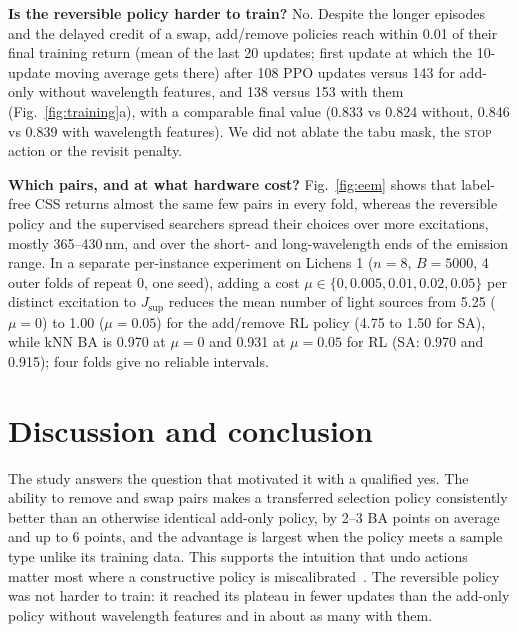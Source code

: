 \documentclass[conference]{IEEEtran}
\newcommand{\JS}{J_{\mathrm{sup}}}
\newcommand{\stp}{\textsc{stop}}
\begin{document}
\textbf{Is the reversible policy harder to train?} No. Despite the longer episodes and the delayed credit of a swap, add/remove policies reach within 0.01 of their final training return (mean of the last 20 updates; first update at which the 10-update moving average gets there) after 108 PPO updates versus 143 for add-only without wavelength features, and 138 versus 153 with them (Fig.~\ref{fig:training}a), with a comparable final value (0.833 vs 0.824 without, 0.846 vs 0.839 with wavelength features). We did not ablate the tabu mask, the \stp{} action or the revisit penalty.

\textbf{Which pairs, and at what hardware cost?} Fig.~\ref{fig:eem} shows that label-free CSS returns almost the same few pairs in every fold, whereas the reversible policy and the supervised searchers spread their choices over more excitations, mostly 365--430\,nm, and over the short- and long-wavelength ends of the emission range. In a separate per-instance experiment on Lichens 1 ($n=8$, $B=5000$, 4 outer folds of repeat 0, one seed), adding a cost $\mu\in\{0,0.005,0.01,0.02,0.05\}$ per distinct excitation to $\JS$ reduces the mean number of light sources from 5.25 ($\mu=0$) to 1.00 ($\mu=0.05$) for the add/remove RL policy (4.75 to 1.50 for SA), while kNN BA is 0.970 at $\mu=0$ and 0.931 at $\mu=0.05$ for RL (SA: 0.970 and 0.915); four folds give no reliable intervals.



\section{Discussion and conclusion}
The study answers the question that motivated it with a qualified yes. The ability to remove and swap pairs makes a transferred selection policy consistently better than an otherwise identical add-only policy, by 2--3 BA points on average and up to 6 points, and the advantage is largest when the policy meets a sample type unlike its training data. This supports the intuition that undo actions matter most where a constructive policy is miscalibrated~\cite{barrett2020eco}. The reversible policy was not harder to train: it reached its plateau in fewer updates than the add-only policy without wavelength features and in about as many with them.
\end{document}
